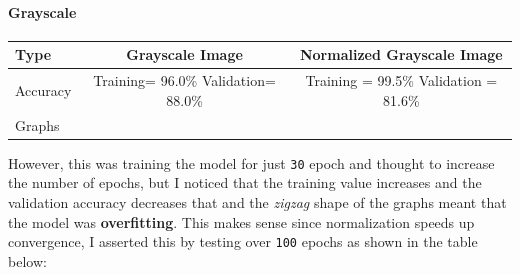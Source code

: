 \documentclass[11pt]{article}
\begin{document}
\hypertarget{grayscale}{%
\paragraph{Grayscale}\label{grayscale}}

\begin{longtable}[]{@{}lcc@{}}
\toprule
\begin{minipage}[b]{0.24\columnwidth}\raggedright
Type\strut
\end{minipage} & \begin{minipage}[b]{0.34\columnwidth}\centering
Grayscale Image\strut
\end{minipage} & \begin{minipage}[b]{0.34\columnwidth}\centering
Normalized Grayscale Image\strut
\end{minipage}\tabularnewline
\midrule
\endhead
\begin{minipage}[t]{0.24\columnwidth}\raggedright
Accuracy\strut
\end{minipage} & \begin{minipage}[t]{0.34\columnwidth}\centering
Training= 96.0\% Validation= 88.0\%\strut
\end{minipage} & \begin{minipage}[t]{0.34\columnwidth}\centering
Training = 99.5\% Validation = 81.6\%\strut
\end{minipage}\tabularnewline
\begin{minipage}[t]{0.24\columnwidth}\raggedright
Graphs\strut
\end{minipage} & \begin{minipage}[t]{0.34\columnwidth}\centering
\strut
\end{minipage} & \begin{minipage}[t]{0.34\columnwidth}\centering
\strut
\end{minipage}\tabularnewline
\bottomrule
\end{longtable}

However, this was training the model for just \texttt{30} epoch and
thought to increase the number of epochs, but I noticed that the
training value increases and the validation accuracy decreases that and
the \emph{zigzag} shape of the graphs meant that the model was
\textbf{overfitting}. This makes sense since normalization speeds up
convergence, I asserted this by testing over \texttt{100} epochs as
shown in the table below:
\end{document}
